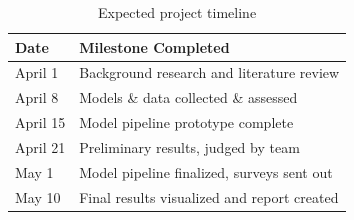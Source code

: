 \documentclass{article}
\begin{document}
\begin{table}[h]
\centering
\begin{tabular}{|l|l|}
\hline
\textbf{Date} & \textbf{Milestone Completed}                \\ \hline
April 1       & Background research and literature review     \\ \hline
April 8       & Models \& data collected \& assessed \\ \hline
April 15      & Model pipeline prototype complete
\\ \hline
April 21      & Preliminary results, judged by team         \\ \hline
May 1         & Model pipeline finalized, surveys sent out  \\ \hline
May 10        & Final results visualized and report created \\ \hline
\end{tabular}
\caption{Expected project timeline}
\end{table}

\newpage


\end{document}
